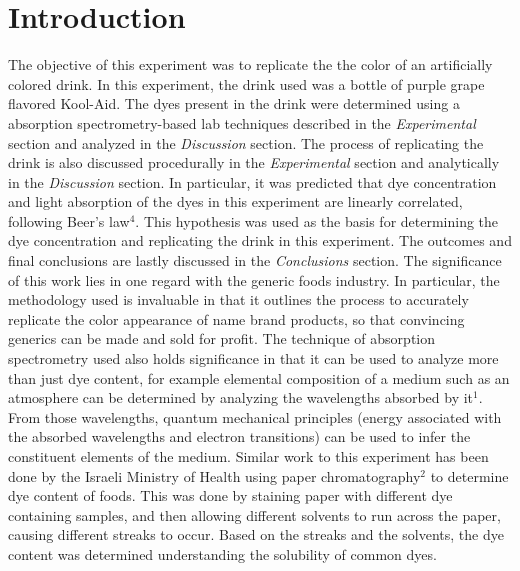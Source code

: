 \documentclass[12pt]{article}
\begin{document}
\section{Introduction}\doublespacing
The objective of this experiment was to replicate the the color of an artificially colored drink. In this experiment, the drink used was a bottle of purple grape flavored Kool-Aid. The dyes present in the drink were determined using a absorption spectrometry-based lab techniques described in the \textit{Experimental} section and analyzed in the \textit{Discussion} section. The process of replicating the drink is also discussed procedurally in the \textit{Experimental} section and analytically in the \textit{Discussion} section. In particular, it was predicted that dye concentration and light absorption of the dyes in this experiment are linearly correlated, following Beer's law$^4$. This hypothesis was used as the basis for determining the dye concentration and replicating the drink in this experiment. The outcomes and final conclusions are lastly discussed in the \textit{Conclusions} section. The significance of this work lies in one regard with the generic foods industry. In particular, the methodology used is invaluable in that it outlines the process to accurately replicate the color appearance of name brand products, so that convincing generics can be made and sold for profit. The technique of absorption spectrometry used also holds significance in that it can be used to analyze more than just dye content, for example elemental composition of a medium such as an atmosphere can be determined by analyzing the wavelengths absorbed by it$^{1}$. From those wavelengths, quantum mechanical principles (energy associated with the absorbed wavelengths and electron transitions) can be used to infer the constituent elements of the medium. Similar work to this experiment has been done by the Israeli Ministry of Health using paper chromatography$^{2}$ to determine dye content of foods. This was done by staining paper with different dye containing samples, and then allowing different solvents to run across the paper, causing different streaks to occur. Based on the streaks and the solvents, the dye content was determined understanding the solubility of common dyes.
\end{document}
